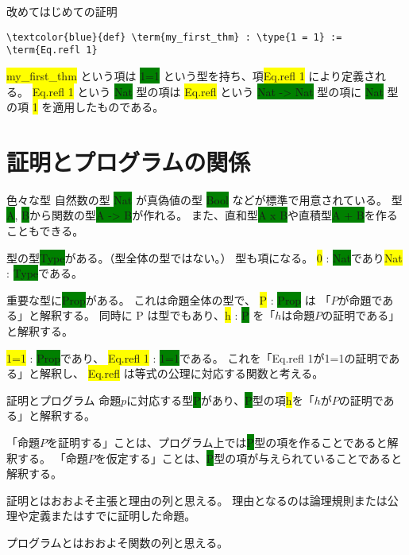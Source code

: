 \documentclass[unicode,12pt]{beamer}%
\newcommand{\type}[1]{\colorbox{green}{#1}}
\newcommand{\term}[1]{\colorbox{yellow}{#1}}
\begin{document}
\begin{frame}[fragile]{改めてはじめての証明}
  \begin{tcolorbox}[title=FirstTheorem.lean]
  \setlength{\baselineskip}{12pt}
  \begin{Verbatim}[commandchars=\\\{\}, baselinestretch=1.5]
\textcolor{blue}{def} \term{my_first_thm} : \type{1 = 1} := \term{Eq.refl 1}
  \end{Verbatim}
  \end{tcolorbox}

  \pause

  \term{my\_first\_thm} という項は \type{1=1} という型を持ち、項\term{Eq.refl 1} により定義される。
  \term{Eq.refl 1} という \type{Nat} 型の項は \term{Eq.refl} という \type{Nat -> Nat} 型の項に \type{Nat} 型の項 \term{1} を適用したものである。
\end{frame}

\section{証明とプログラムの関係}

\begin{frame}{色々な型}
  自然数の型 \type{Nat} が真偽値の型 \type{Bool} などが標準で用意されている。
  型\type{A}, \type{B}から関数の型\type{A -> B}が作れる。
  また、直和型\type{A x B}や直積型\type{A + B}を作ることもできる。

  \pause

  型の型\type{Type}がある。（型全体の型ではない。）
  型も項になる。
  \term{0} : \type{Nat}であり\term{Nat} : \type{Type}である。

  \pause

  重要な型に\type{Prop}がある。
  これは命題全体の型で、 \term{P} : \type{Prop} は 「$P$が命題である」と解釈する。
  同時に P は型でもあり、\term{h} : \type{P} を「$h$は命題$P$の証明である」と解釈する。

  \pause

  \term{1=1} : \type{Prop}であり、
  \term{Eq.refl 1} : \type{1=1}である。
  これを「Eq.refl 1が1=1の証明である」と解釈し、
  \term{Eq.refl} は等式の公理に対応する関数と考える。
\end{frame}

\begin{frame}{証明とプログラム}
  命題$p$に対応する型\type{P}があり、\type{P}型の項\term{h}を「$h$が$P$の証明である」と解釈する。

  「命題$P$を証明する」ことは、プログラム上では\type{P}型の項を作ることであると解釈する。
  「命題$P$を仮定する」ことは、\type{P}型の項が与えられていることであると解釈する。

  \pause

  証明とはおおよそ主張と理由の列と思える。
  理由となるのは論理規則または公理や定義またはすでに証明した命題。

  プログラムとはおおよそ関数の列と思える。
\end{frame}
\end{document}
